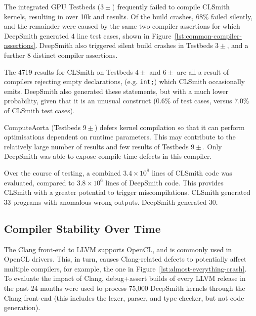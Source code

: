 

The integrated GPU Testbeds ($3\pm$) frequently failed to compile CLSmith kernels, resulting in over 10k \bc and \bto results. Of the build crashes, 68\% failed silently, and the remainder were caused by the same two compiler assertions for which DeepSmith generated 4 line test cases, shown in Figure~\ref{lst:common-compiler-assertions}. DeepSmith also triggered silent build crashes in Testbeds $3\pm$, and a further 8 distinct compiler assertions.

The 4719 \abf results for CLSmith on Testbeds $4\pm$ and $6\pm$ are all a result of compilers rejecting empty declarations, (e.g. \texttt{int;}) which CLSmith occasionally emits. DeepSmith also generated these statements, but with a much lower probability, given that it is an unusual construct (0.6\% of test cases, versus 7.0\% of CLSmith test cases).

ComputeAorta (Testbeds $9\pm$) defers kernel compilation so that it can perform optimisations dependent on runtime parameters. This may contribute to the relatively large number of \arc results and few \bc results of Testbeds $9\pm$. Only DeepSmith was able to expose compile-time defects in this compiler.

Over the course of testing, a combined $3.4 \times 10^8$ lines of CLSmith code was evaluated, compared to $3.8 \times 10^6$ lines of DeepSmith code. This provides CLSmith with a greater potential to trigger miscompilations. CLSmith generated 33 programs with anomalous wrong-outputs. DeepSmith generated 30.


\subsection{Compiler Stability Over Time}%
\label{subsec:clangs}

The Clang front-end to LLVM supports OpenCL, and is commonly used in OpenCL drivers. This, in turn, causes Clang-related defects to potentially affect multiple compilers, for example, the one in Figure~\ref{lst:almost-everything-crash}. To evaluate the impact of Clang, debug+assert builds of every LLVM release in the past 24 months were used to process 75,000 DeepSmith kernels through the Clang front-end (this includes the lexer, parser, and type checker, but not code generation).


